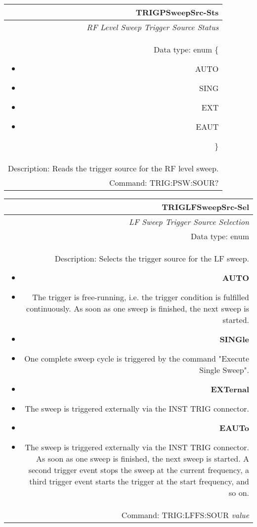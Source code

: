 \documentclass[openany]{article}
\begin{document}
		\begin{tabular}{N}
			\hline
			\bfseries TRIGPSweepSrc-Sts \\ \hline
			\emph{RF Level Sweep Trigger Source Status} \\
			Data type: enum \{\begin{itemize}[noitemsep]
				\small
				\item[] AUTO
				\item[] SING
				\item[] EXT
				\item[] EAUT
			\end{itemize}\} \\ 
			Description: Reads the trigger source for the RF level sweep. \\
			Command: TRIG:PSW:SOUR? \\

		\end{tabular}
%
		\begin{tabular}{N}
			\hline
			\bfseries TRIGLFSweepSrc-Sel \\ \hline
			\emph{LF Sweep Trigger Source Selection} \\
			Data type: enum \\   
			Description: Selects the trigger source for the LF sweep.\begin{itemize}[noitemsep]
				\small
				\item[] \textbf{AUTO}
				\item[] The trigger is free-running, i.e. the trigger condition is fulfilled continuously. As soon as one sweep is finished, the next sweep is started.
                                \item[] \textbf{SINGle}
				\item[] One complete sweep cycle is triggered by the command "Execute Single Sweep".
				\item[] \textbf{EXTernal}
				\item[] The sweep is triggered externally via the INST TRIG connector.
                                \item[] \textbf{EAUTo}
				\item[] The sweep is triggered externally via the INST TRIG connector. As soon as one sweep is finished, the next sweep is started. A second trigger event stops the sweep at the current frequency, a third trigger event starts the trigger at the start frequency, and so on.

			\end{itemize} \\
			Command: TRIG:LFFS:SOUR \emph{value} \\

		\end{tabular}
\end{document}

